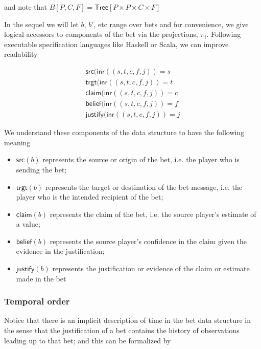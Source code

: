 \documentclass[]{acm_proc_article-sp}
\numberwithin{equation}{subsection}
\begin{document}
and note that $B[P,C,F] = \mathsf{Tree}[P \times P \times C \times F]$

In the sequel we will let $b$, $b'$, etc range over bets and for
convenience, we give logical accessors to components of the bet via
the projections, $\pi_i$. Following executable specification
languages like Haskell or Scala, we can improve readability 

\begin{equation*}
  \begin{aligned}
    \mathsf{src}( \mathsf{inr}( ( s, t, c, f, j ) ) = s  \\
    \mathsf{trgt}( \mathsf{inr}( ( s, t, c, f, j ) ) = t \\
    \mathsf{claim}( \mathsf{inr}( ( s, t, c, f, j ) ) = c  \\    
    \mathsf{belief}( \mathsf{inr}( ( s, t, c, f, j ) ) = f  \\    
    \mathsf{justify}( \mathsf{inr}( ( s, t, c, f, j ) ) = j 
  \end{aligned}
\end{equation*}

We understand these components of the data structure to have the
following meaning

\begin{itemize}
  \item $\mathsf{src}( b )$ represents the source or origin of the
    bet, i.e. the player who is sending the bet;
  \item $\mathsf{trgt}( b )$ represents the target or destination of
    the bet message, i.e. the player who is the intended recipient of
    the bet;
  \item $\mathsf{claim}( b )$ represents the claim of the bet,
    i.e. the source player's estimate of a value;
  \item $\mathsf{belief}( b )$ represents the source player's confidence in
    the claim given the evidence in the justification;
  \item $\mathsf{justify}( b )$ represents the justification or
    evidence of the claim or estimate made in the bet
\end{itemize}

\subsubsection{Temporal order} 

Notice that there is an implicit description
of time in the bet data structure in the sense that the justification
of a bet contains the history of observations leading up to that bet;
and this can be formalized by
\end{document}
